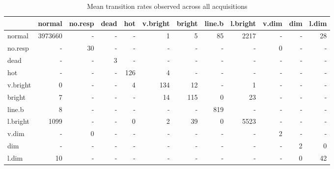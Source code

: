 \documentclass[10pt,fleqn]{article}\usepackage[]{graphicx}\usepackage[]{color}
\begin{document}
\begin{table}[!ht]
\caption{Mean transition rates observed across all acquisitions}
\begingroup\footnotesize
\begin{tabular}{l|rrrrrrrrrrr}
  \hline
 & normal & no.resp & dead & hot & v.bright & bright & line.b & l.bright & v.dim & dim & l.dim \\ 
  \hline
normal & 3973660 & - & - & - & 1 & 5 & 85 & 2217 & - & - & 28 \\ 
  no.resp & - & 30 & - & - & - & - & - & - & 0 & - & - \\ 
  dead & - & - & 3 & - & - & - & - & - & - & - & - \\ 
  hot & - & - & - & 126 & 4 & - & - & - & - & - & - \\ 
  v.bright & 0 & - & - & 4 & 134 & 12 & - & 1 & - & - & - \\ 
  bright & 7 & - & - & - & 14 & 115 & 0 & 23 & - & - & - \\ 
  line.b & 8 & - & - & - & - & - & 819 & - & - & - & - \\ 
  l.bright & 1099 & - & - & 0 & 2 & 39 & 0 & 5523 & - & - & - \\ 
  v.dim & - & 0 & - & - & - & - & - & - & 2 & - & - \\ 
  dim & - & - & - & - & - & - & - & - & - & 2 & 0 \\ 
  l.dim & 10 & - & - & - & - & - & - & - & - & 0 & 42 \\ 
   \hline
\end{tabular}
\endgroup

\end{table}
\end{document}
